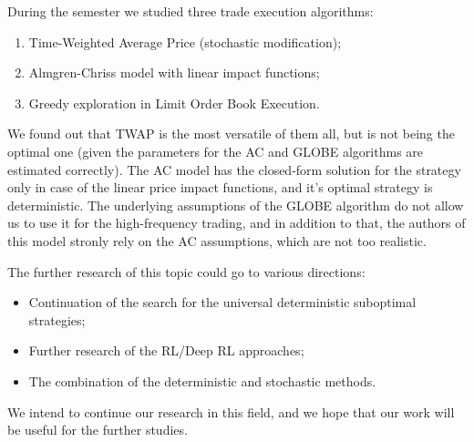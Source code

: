\conclusion %
    During the semester we studied three trade execution algorithms:
    \begin{enumerate}
        \item Time-Weighted Average Price (stochastic modification);
        \item Almgren-Chriss model with linear impact functions;
        \item Greedy exploration in Limit Order Book Execution.
    \end{enumerate}
    We found out that TWAP is the most versatile of them all, but is not being the optimal one (given the parameters for the AC and GLOBE algorithms are estimated correctly). 
    The AC model has the closed-form solution for the strategy only in case of the 
    linear price impact functions, and it's optimal strategy is deterministic.
    The underlying assumptions of the GLOBE algorithm do not allow us to use it for the high-frequency trading, and in 
    addition to that, the authors of this model stronly rely on the AC assumptions, which are not too realistic. 

    The further research of this topic could go to various directions:
    \begin{itemize}
        \item Continuation of the search for the universal deterministic suboptimal strategies;
        \item Further research of the RL/Deep RL approaches;
        \item The combination of the deterministic and stochastic methods.
    \end{itemize}

    We intend to continue our research in this field, and we hope that our work will be useful for the further studies.